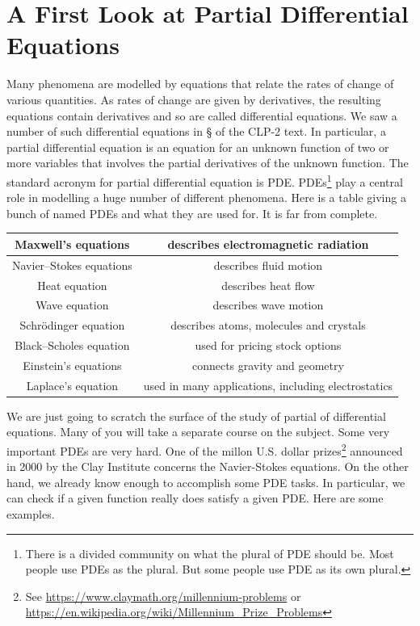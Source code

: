 \section{A First Look at Partial Differential Equations}\label{sec pde}

Many phenomena are modelled by equations that relate the rates of
change of various quantities. As rates of change are given by derivatives,
the resulting equations contain derivatives and so are called
differential equations. We saw a number of such differential equations
in \S{} of the CLP-2 text. In particular, a partial differential equation is an equation for an unknown function of two or more 
variables that involves the partial derivatives of the unknown function. 
The standard acronym for partial differential equation is PDE. PDEs\footnote{There is a divided community on what the plural of PDE should be.
Most people use PDEs as the plural. But some people use PDE as its own plural.} play a central role in modelling a huge number of different phenomena. Here is a table giving a bunch of named PDEs and what they are used for. It is far from complete.

\begin{center}
\renewcommand{\arraystretch}{1.4}
     \begin{tabular}{|c|c|}
        \hline
  Maxwell's equations
      &describes electromagnetic radiation \\ \hline
  Navier--Stokes equations
      &describes fluid motion \\ \hline
  Heat equation
      &describes heat flow \\ \hline
  Wave equation
      &describes wave motion \\ \hline
  Schr\"odinger equation
      &describes atoms, molecules and crystals \\ \hline
  Black--Scholes equation
      &used for pricing stock options \\ \hline
  Einstein's equations
      &connects gravity and geometry  \\ \hline
  Laplace's equation
      &used in many applications, including electrostatics
     \\ \hline
     \end{tabular}
\renewcommand{\arraystretch}{1.0}
\end{center}


We are just going to scratch the surface of the study of partial of differential equations. Many of you will take a separate course on the subject. Some very important PDEs are very hard. One of the 
millon U.S. dollar prizes\footnote{See \url{https://www.claymath.org/millennium-problems} or
\url{https://en.wikipedia.org/wiki/Millennium_Prize_Problems}} announced in 2000 
by the Clay Institute concerns the Navier-Stokes equations. On the other hand, 
we already know enough to accomplish some PDE tasks. In particular, we can check if a given function really does satisfy a given PDE. Here are some examples.

